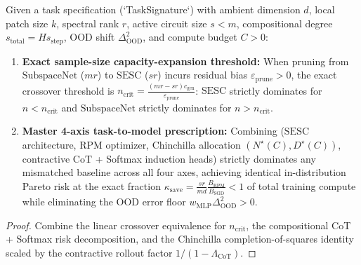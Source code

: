 \begin{lemma}\label{lem:predictive_model_prescription}
\leanok
{}
Given a task specification (`TaskSignature`) with ambient dimension $d$, local patch size $k$, spectral rank $r$, active circuit size $s < m$, compositional degree $s_{\mathrm{total}} = H s_{\mathrm{step}}$, OOD shift $\Delta_{\mathrm{OOD}}^2$, and compute budget $C > 0$:
\begin{enumerate}
\item \textbf{Exact sample-size capacity-expansion threshold:} When pruning from $\mathrm{SubspaceNet}$ ($mr$) to $\mathrm{SESC}$ ($sr$) incurs residual bias $\varepsilon_{\mathrm{prune}} > 0$, the exact crossover threshold is $n_{\mathrm{crit}} = \frac{(mr - sr)c_{\mathrm{gen}}}{\varepsilon_{\mathrm{prune}}}$: $\mathrm{SESC}$ strictly dominates for $n < n_{\mathrm{crit}}$ and $\mathrm{SubspaceNet}$ strictly dominates for $n > n_{\mathrm{crit}}$.
\item \textbf{Master 4-axis task-to-model prescription:} Combining ($\mathrm{SESC}$ architecture, $\mathrm{RPM}$ optimizer, Chinchilla allocation $(N^\star(C), D^\star(C))$, contractive $\mathrm{CoT}$ + Softmax induction heads) strictly dominates any mismatched baseline across all four axes, achieving identical in-distribution Pareto risk at the exact fraction $\kappa_{\mathrm{save}} = \frac{sr}{md}\frac{B_{\mathrm{RPM}}}{B_{\mathrm{SGD}}} < 1$ of total training compute while eliminating the OOD error floor $w_{\mathrm{MLP}}\Delta_{\mathrm{OOD}}^2 > 0$.
\end{enumerate}
\end{lemma}
\begin{proof}
\leanok
Combine the linear crossover equivalence for $n_{\mathrm{crit}}$, the compositional CoT + Softmax risk decomposition, and the Chinchilla completion-of-squares identity scaled by the contractive rollout factor $1/(1-\Lambda_{\mathrm{CoT}})$.
\end{proof}

